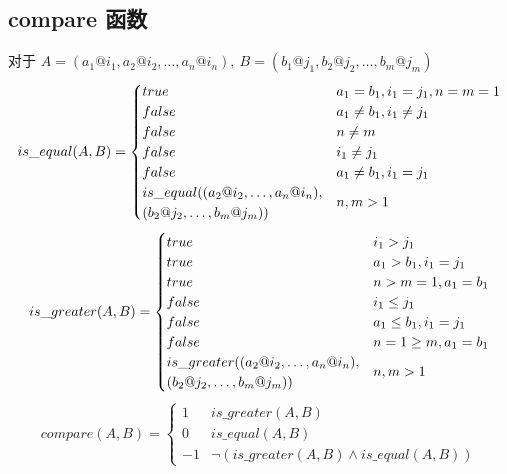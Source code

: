 \documentclass[UTF8]{ctexart}
\begin{document}
\subsection{compare 函数}
对于 $A=(a_1@i_1,a_2@i_2,\dots,a_n@i_n),\ B=(b_1@j_1,b_2@j_2,\dots,b_m@j_m)$
\[
is\_equal(A,B)=\begin{cases}
true & a_1=b_1,i_1=j_1,n=m=1\\
false & a_1\neq b_1,i_1\neq j_1\\
false & n\neq m\\
false & i_1\neq j_1\\
false & a_1\neq b_1,i_1=j_1\\
\begin{array}{@{}l@{}}is\_equal((a_2@i_2,\dots,a_n@i_n),\\ (b_2@j_2,\dots,b_m@j_m))\end{array} & n,m>1
\end{cases}
\]
\[
is\_greater(A,B)=\begin{cases}
true & i_1>j_1\\
true & a_1>b_1,i_1=j_1\\
true & n>m=1,a_1=b_1\\
false & i_1\le j_1\\
false & a_1\le b_1,i_1=j_1\\
false & n=1\ge m,a_1=b_1\\
\begin{array}{@{}l@{}}is\_greater((a_2@i_2,\dots,a_n@i_n),\\ (b_2@j_2,\dots,b_m@j_m))\end{array} & n,m>1
\end{cases}
\]
\[
compare(A,B)=\begin{cases}
1 & is\_greater(A,B)\\
0 & is\_equal(A,B)\\
-1 & \lnot(is\_greater(A,B)\land is\_equal(A,B))
\end{cases}
\]
\end{document}
